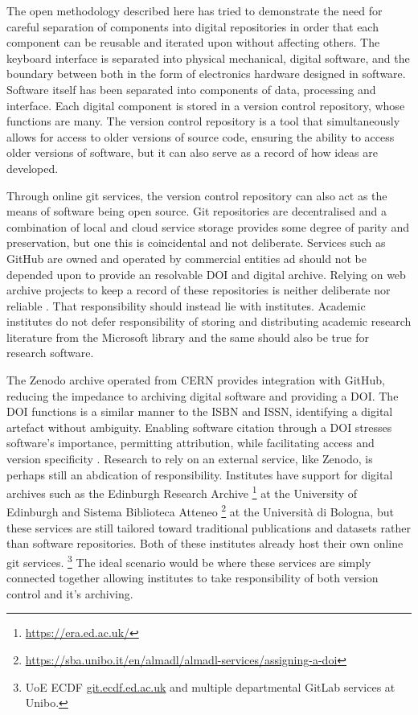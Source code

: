 The open methodology described here has tried to demonstrate the need for
careful separation of components into digital repositories in order that each
component can be reusable and iterated upon without affecting others. The
keyboard interface is separated into physical mechanical, digital software, and
the boundary between both in the form of electronics hardware designed in
software. Software itself has been separated into components of data, processing
and interface. Each digital component is stored in a version control repository,
whose functions are many. The version control repository is a tool that
simultaneously allows for access to older versions of source code, ensuring the
ability to access older versions of software, but it can also serve as a record
of how ideas are developed.

Through online git services, the version control repository can also act as the
means of software being open source. Git repositories are decentralised and a
combination of local and cloud service storage provides some degree of parity
and preservation, but one this is coincidental and not deliberate. Services such
as GitHub are owned and operated by commercial entities ad should not be
depended upon to provide an resolvable DOI and digital archive. Relying on web
archive projects to keep a record of these repositories is neither deliberate
nor reliable \cite{calano_github_2025}. That responsibility should instead lie
with institutes. Academic institutes do not defer responsibility of storing and
distributing academic research literature from the Microsoft library and the
same should also be true for research software.

The Zenodo archive operated from CERN provides integration with GitHub, reducing
the impedance to archiving digital software and providing a DOI. The DOI
functions is a similar manner to the ISBN and ISSN, identifying a digital
artefact without ambiguity. Enabling software citation through a DOI stresses
software's importance, permitting attribution, while facilitating access and
version specificity \cite{soito_citations_2016}. Research to rely on an external
service, like Zenodo, is perhaps still an abdication of responsibility.
Institutes have support for digital archives such as the Edinburgh Research
Archive%
\footnote{\url{https://era.ed.ac.uk/}} at the University of Edinburgh and
Sistema Biblioteca Atteneo%
\footnote{\url{https://sba.unibo.it/en/almadl/almadl-services/assigning-a-doi}}
at the Università di Bologna, but these services are still tailored toward
traditional publications and datasets rather than software repositories. Both of
these institutes already host their own online git services.%
\footnote{UoE ECDF \url{git.ecdf.ed.ac.uk} and multiple departmental GitLab
    services at Unibo.} The ideal scenario would be where these services are simply
connected together allowing institutes to take responsibility of both version
control and it's archiving.

